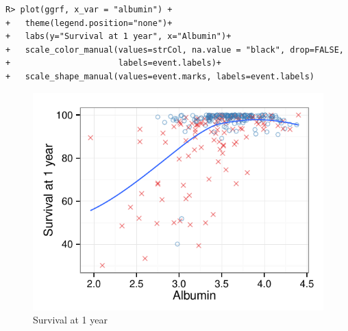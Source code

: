 \documentclass[nojss]{jss}\usepackage[]{graphicx}\usepackage[]{color}
\makeatletter
\def\maxwidth{ %
  \ifdim\Gin@nat@width>\linewidth
    \linewidth
  \else
    \Gin@nat@width
  \fi
}
\newenvironment{kframe}{%
 \def\at@end@of@kframe{}%
 \ifinner\ifhmode%
  \def\at@end@of@kframe{\end{minipage}}%
  \begin{minipage}{\columnwidth}%
 \fi\fi%
 \def\FrameCommand##1{\hskip\@totalleftmargin \hskip-\fboxsep
 \colorbox{shadecolor}{##1}\hskip-\fboxsep
     \hskip-\linewidth \hskip-\@totalleftmargin \hskip\columnwidth}%
 \MakeFramed {\advance\hsize-\width
   \@totalleftmargin\z@ \linewidth\hsize
   \@setminipage}}%
 {\par\unskip\endMakeFramed%
 \at@end@of@kframe}
\newenvironment{knitrout}{}{} %
\makeatother
\begin{document}
\begin{knitrout}\footnotesize
{}\color{fgcolor}\begin{kframe}
\begin{verbatim}
R> plot(ggrf, x_var = "albumin") +
+   theme(legend.position="none")+
+   labs(y="Survival at 1 year", x="Albumin")+
+   scale_color_manual(values=strCol, na.value = "black", drop=FALSE,
+                      labels=event.labels)+
+   scale_shape_manual(values=event.marks, labels=event.labels)
\end{verbatim}
\end{kframe}\begin{figure}[!htpb]

{\centering \includegraphics[width=\maxwidth]{figure/rfs-variable-plotAlbumin-1} 

}

\caption[Survival at 1 year]{Survival at 1 year\label{fig:variable-plotAlbumin}}
\end{figure}


\end{knitrout}
\end{document}
